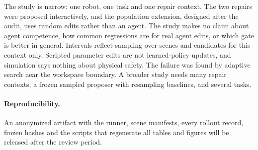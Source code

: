 \documentclass[letterpaper]{article} %
\begin{document}
The study is narrow: one robot, one task and one repair context. The two repairs were proposed interactively, and the population extension, designed after the audit, uses random edits rather than an agent. The study makes no claim about agent competence, how common regressions are for real agent edits, or which gate is better in general. Intervals reflect sampling over scenes and candidates for this context only. Scripted parameter edits are not learned-policy updates, and simulation says nothing about physical safety. The failure was found by adaptive search near the workspace boundary. A broader study needs many repair contexts, a frozen sampled proposer with resampling baselines, and several tasks.

\paragraph{Reproducibility.} An anonymized artifact with the runner, scene manifests, every rollout record, frozen hashes and the scripts that regenerate all tables and figures will be released after the review period.


\end{document}
